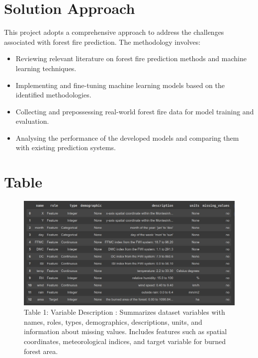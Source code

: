 
\section{Solution Approach}
This project adopts a comprehensive approach to address the challenges associated with forest fire prediction. The methodology involves:
\begin{itemize}
    \item Reviewing relevant literature on forest fire prediction methods and machine learning techniques.
    \item Implementing and fine-tuning machine learning models based on the identified methodologies.
    \item Collecting and prepossessing real-world forest fire data for model training and evaluation.
    \item Analysing the performance of the developed models and comparing them with existing prediction systems.
\end{itemize}

\section{Table}
\begin{figure}
    \centering
    \includegraphics[scale=0.6]{figures/Summary data set.jpg}
    \caption{Table 1: Variable Description : Summarizes dataset variables with names, roles, types, demographics, descriptions, units, and information about missing values. Includes features such as spatial coordinates, meteorological indices, and target variable for burned forest area.}
\end{figure}



